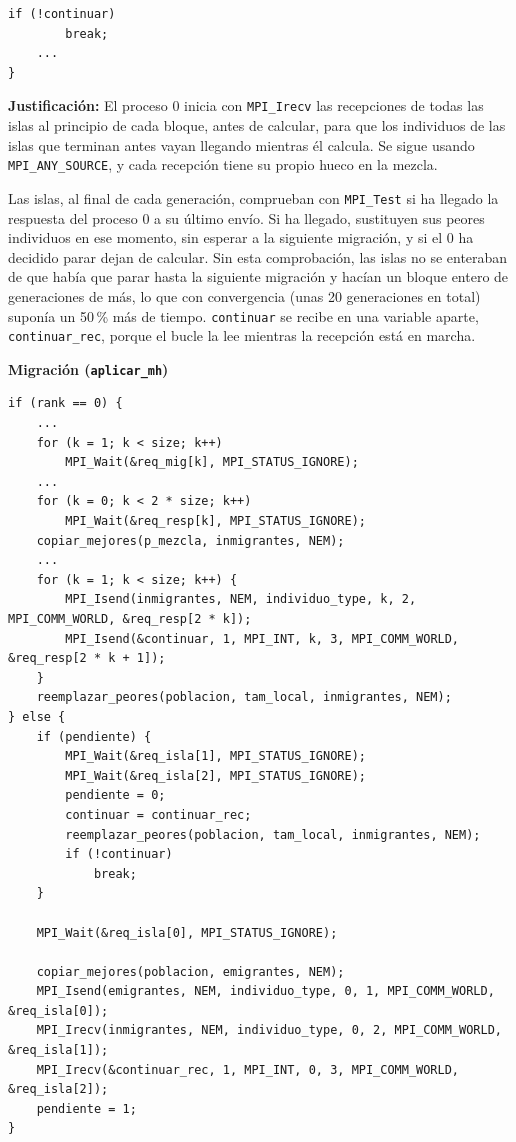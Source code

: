 \documentclass[12pt]{article}
\begin{document}
\begin{enumerate}
\begin{lstlisting}[style=EstiloC]
	if (!continuar)
		break;
	...
}
\end{lstlisting}

\textbf{Justificación:} El proceso 0 inicia con \texttt{MPI\_Irecv} las recepciones de todas las islas al principio de cada bloque, antes de calcular, para que los individuos de las islas que terminan antes vayan llegando mientras él calcula. Se sigue usando \texttt{MPI\_ANY\_SOURCE}, y cada recepción tiene su propio hueco en la mezcla.

Las islas, al final de cada generación, comprueban con \texttt{MPI\_Test} si ha llegado la respuesta del proceso 0 a su último envío. Si ha llegado, sustituyen sus peores individuos en ese momento, sin esperar a la siguiente migración, y si el 0 ha decidido parar dejan de calcular. Sin esta comprobación, las islas no se enteraban de que había que parar hasta la siguiente migración y hacían un bloque entero de generaciones de más, lo que con convergencia (unas 20 generaciones en total) suponía un 50\,\% más de tiempo. \texttt{continuar} se recibe en una variable aparte, \texttt{continuar\_rec}, porque el bucle la lee mientras la recepción está en marcha.

\vspace{0.5cm}


\medskip
\noindent\textbf{Migración (\texttt{aplicar\_mh})}\par
\smallskip

\begin{lstlisting}[style=EstiloC]
if (rank == 0) {
	...
	for (k = 1; k < size; k++)
		MPI_Wait(&req_mig[k], MPI_STATUS_IGNORE);
	...
	for (k = 0; k < 2 * size; k++)
		MPI_Wait(&req_resp[k], MPI_STATUS_IGNORE);
	copiar_mejores(p_mezcla, inmigrantes, NEM);
	...
	for (k = 1; k < size; k++) {
		MPI_Isend(inmigrantes, NEM, individuo_type, k, 2, MPI_COMM_WORLD, &req_resp[2 * k]);
		MPI_Isend(&continuar, 1, MPI_INT, k, 3, MPI_COMM_WORLD, &req_resp[2 * k + 1]);
	}
	reemplazar_peores(poblacion, tam_local, inmigrantes, NEM);
} else {
	if (pendiente) {
		MPI_Wait(&req_isla[1], MPI_STATUS_IGNORE);
		MPI_Wait(&req_isla[2], MPI_STATUS_IGNORE);
		pendiente = 0;
		continuar = continuar_rec;
		reemplazar_peores(poblacion, tam_local, inmigrantes, NEM);
		if (!continuar)
			break;
	}

	MPI_Wait(&req_isla[0], MPI_STATUS_IGNORE);

	copiar_mejores(poblacion, emigrantes, NEM);
	MPI_Isend(emigrantes, NEM, individuo_type, 0, 1, MPI_COMM_WORLD, &req_isla[0]);
	MPI_Irecv(inmigrantes, NEM, individuo_type, 0, 2, MPI_COMM_WORLD, &req_isla[1]);
	MPI_Irecv(&continuar_rec, 1, MPI_INT, 0, 3, MPI_COMM_WORLD, &req_isla[2]);
	pendiente = 1;
}
\end{lstlisting}


\end{enumerate}
\end{document}
